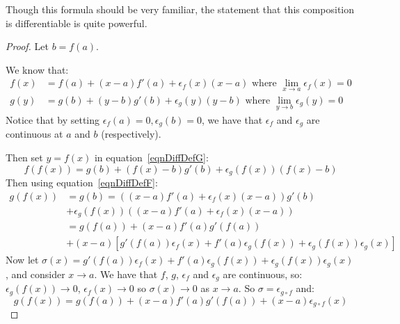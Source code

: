 \documentclass[../Main.tex]{subfiles}
\begin{document}
\begin{remark}
    Though this formula should be very familiar, the statement that this composition is differentiable is quite powerful.
\end{remark}
\begin{proof}
    Let $b = f(a)$.\par
    We know that:
    \begin{align}
        f(x) &= f(a) + (x-a) f'(a) + \epsilon_f(x) (x - a) \text{ where } \lim_{x \to a} \epsilon_f(x) = 0 \label{eqnDiffDefF} \\
        g(y) &= g(b) + (y-b) g'(b) + \epsilon_g(y) (y - b) \text{ where } \lim_{y \to b} \epsilon_g(y) = 0 \label{eqnDiffDefG}
    \end{align}
    Notice that by setting $\epsilon_f(a) = 0, \epsilon_g(b) = 0$, we have that $\epsilon_f$ and $\epsilon_g$ are continuous at $a$ and $b$ (respectively).\par
    Then set $y = f(x)$ in equation~\ref{eqnDiffDefG}:
    \begin{equation*}
        f(f(x)) = g(b) + (f(x) - b) g'(b) + \epsilon_g(f(x))(f(x) - b)
    \end{equation*}
    Then using equation~\ref{eqnDiffDefF}:
    \begin{align*}
        g(f(x)) &= g(b) = \left((x - a) f'(a) + \epsilon_f(x)(x - a)\right) g'(b) \\
        &+ \epsilon_g(f(x))\left((x - a) f'(a) + \epsilon_f(x) (x - a)\right) \\
        &= g(f(a)) + (x - a)f'(a) g'(f(a)) \\
        &+ (x - a) \left[g'(f(a)) \epsilon_f(x) + f'(a) \epsilon_g(f(x)) + \epsilon_g(f(x)) \epsilon_g(x)\right]
    \end{align*}
    Now let $\sigma(x) = g'(f(a)) \epsilon_f(x) + f'(a) \epsilon_g(f(x)) + \epsilon_g(f(x)) \epsilon_g(x)$, and consider $x \to a$. We have that $f$, $g$, $\epsilon_f$ and $\epsilon_g$ are continuous, so:
    $\epsilon_g(f(x)) \to 0$, $\epsilon_f(x) \to 0$ so $\sigma(x) \to 0$ as $x \to a$. So $\sigma = \epsilon_{g \circ f}$ and:
    \begin{equation*}
        g(f(x)) = g(f(a)) + (x - a) f'(a) g'(f(a)) + (x - a) \epsilon_{g \circ f}(x)
    \end{equation*}
\end{proof}
\end{document}
